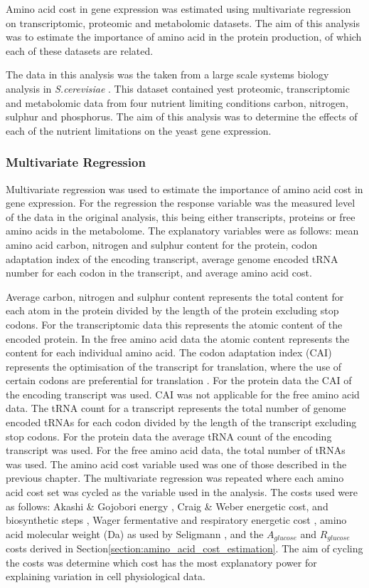 Amino acid cost in gene expression was estimated using multivariate regression on transcriptomic, proteomic and metabolomic datasets. The aim of this analysis was to estimate the importance of amino acid in the protein production, of which each of these datasets are related.

The data in this analysis was the taken from a large scale systems biology analysis in \emph{S.cerevisiae} \cite{castrillo2007}. This dataset contained yest proteomic, transcriptomic and metabolomic data from four nutrient limiting conditions carbon, nitrogen, sulphur and phosphorus. The aim of this analysis was to determine the effects of each of the nutrient limitations on the yeast gene expression.

\subsubsection{Multivariate Regression}

Multivariate regression was used to estimate the importance of amino acid cost in gene expression. For the regression the response variable was the measured level of the data in the original analysis, this being either transcripts, proteins or free amino acids in the metabolome. The explanatory variables were as follows: mean amino acid carbon, nitrogen and sulphur content for the protein, codon adaptation index of the encoding transcript, average genome encoded tRNA number for each codon in the transcript, and average amino acid cost.

Average carbon, nitrogen and sulphur content represents the total content for each atom in the protein divided by the length of the protein excluding stop codons. For the transcriptomic data this represents the atomic content of the encoded protein. In the free amino acid data the atomic content represents the content for each individual amino acid. The codon adaptation index (CAI) represents the optimisation of the transcript for translation, where the use of certain codons are preferential for translation \cite{ikemura1982}. For the protein data the CAI of the encoding transcript was used. CAI was not applicable for the free amino acid data. The tRNA count for a transcript represents the total number of genome encoded tRNAs for each codon divided by the length of the transcript excluding stop codons. For the protein data the average tRNA count of the encoding transcript was used. For the free amino acid data, the total number of tRNAs was used. The amino acid cost variable used was one of those described in the previous chapter. The multivariate regression was repeated where each amino acid cost set was cycled as the variable used in the analysis. The costs used were as follows: Akashi \& Gojobori energy \cite{akashi2002}, Craig \& Weber energetic cost, and biosynthetic steps \cite{craig1998}, Wager fermentative and respiratory energetic cost \cite{wagner2005}, amino acid molecular weight (Da) as used by Seligmann \cite{seligmann2004}, and the $A_{glucose}$ and $R_{glucose}$ costs derived in Section\vref{section:amino_acid_cost_estimation}. The aim of cycling the costs was determine which cost has the most explanatory power for explaining variation in cell physiological data.


